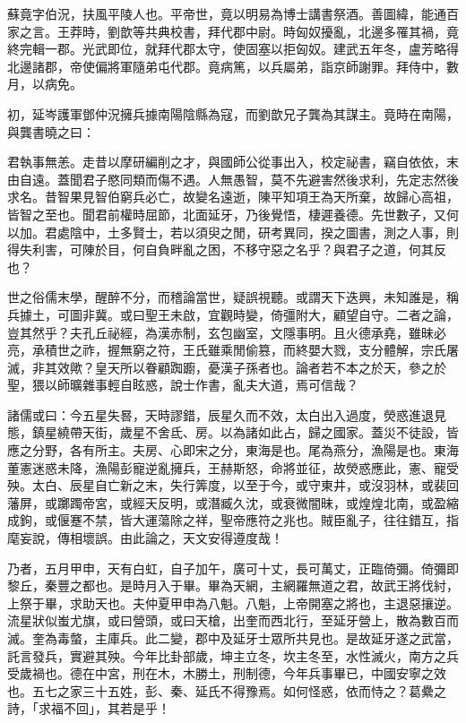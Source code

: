 
\begin{pinyinscope}
蘇竟字伯況，扶風平陵人也。平帝世，竟以明易為博士講書祭酒。善圖緯，能通百家之言。王莽時，劉歆等共典校書，拜代郡中尉。時匈奴擾亂，北邊多罹其禍，竟終完輯一郡。光武即位，就拜代郡太守，使固塞以拒匈奴。建武五年冬，盧芳略得北邊諸郡，帝使偏將軍隨弟屯代郡。竟病篤，以兵屬弟，詣京師謝罪。拜侍中，數月，以病免。

初，延岑護軍鄧仲況擁兵據南陽陰縣為寇，而劉歆兄子龔為其謀主。竟時在南陽，與龔書曉之曰：

君執事無恙。走昔以摩研編削之才，與國師公從事出入，校定祕書，竊自依依，末由自遠。蓋聞君子愍同類而傷不遇。人無愚智，莫不先避害然後求利，先定志然後求名。昔智果見智伯窮兵必亡，故變名遠逝，陳平知項王為天所棄，故歸心高祖，皆智之至也。聞君前權時屈節，北面延牙，乃後覺悟，棲遲養德。先世數子，又何以加。君處陰中，土多賢士，若以須臾之閒，研考異同，揆之圖書，測之人事，則得失利害，可陳於目，何自負畔亂之困，不移守惡之名乎？與君子之道，何其反也？

世之俗儒末學，醒醉不分，而稽論當世，疑誤視聽。或謂天下迭興，未知誰是，稱兵據土，可圖非冀。或曰聖王未啟，宜觀時變，倚彊附大，顧望自守。二者之論，豈其然乎？夫孔丘祕經，為漢赤制，玄包幽室，文隱事明。且火德承堯，雖昧必亮，承積世之祚，握無窮之符，王氏雖乘閒偷篡，而終嬰大戮，支分體解，宗氏屠滅，非其效歟？皇天所以眷顧踟躕，憂漢子孫者也。論者若不本之於天，參之於聖，猥以師曠雜事輕自眩惑，說士作書，亂夫大道，焉可信哉？

諸儒或曰：今五星失晷，天時謬錯，辰星久而不效，太白出入過度，熒惑進退見態，鎮星繞帶天街，歲星不舍氐、房。以為諸如此占，歸之國家。蓋災不徒設，皆應之分野，各有所主。夫房、心即宋之分，東海是也。尾為燕分，漁陽是也。東海董憲迷惑未降，漁陽彭寵逆亂擁兵，王赫斯怒，命將並征，故熒惑應此，憲、寵受殃。太白、辰星自亡新之末，失行筭度，以至于今，或守東井，或沒羽林，或裴回藩屏，或躑躅帝宮，或經天反明，或潛臧久沈，或衰微闇昧，或煌煌北南，或盈縮成鉤，或偃蹇不禁，皆大運蕩除之祥，聖帝應符之兆也。賊臣亂子，往往錯互，指麾妄說，傳相壞誤。由此論之，天文安得遵度哉！

乃者，五月甲申，天有白虹，自子加午，廣可十丈，長可萬丈，正臨倚彌。倚彌即黎丘，秦豐之都也。是時月入于畢。畢為天網，主網羅無道之君，故武王將伐紂，上祭于畢，求助天也。夫仲夏甲申為八魁。八魁，上帝開塞之將也，主退惡攘逆。流星狀似蚩尤旗，或曰營頭，或曰天槍，出奎而西北行，至延牙營上，散為數百而滅。奎為毒螫，主庫兵。此二變，郡中及延牙士眾所共見也。是故延牙遂之武當，託言發兵，實避其殃。今年比卦部歲，坤主立冬，坎主冬至，水性滅火，南方之兵受歲禍也。德在中宮，刑在木，木勝土，刑制德，今年兵事畢已，中國安寧之效也。五七之家三十五姓，彭、秦、延氏不得豫焉。如何怪惑，依而恃之？葛纍之詩，「求福不回」，其若是乎！


\end{pinyinscope}
